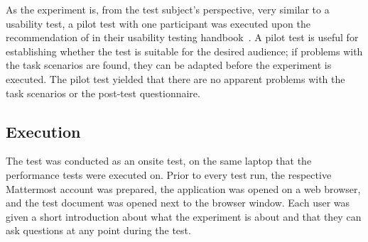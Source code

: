 As the experiment is, from the test subject's perspective, very similar to a usability test, a pilot test with one participant was executed upon the recommendation of \citeauthor{rubin2008handbook} in their usability testing handbook~\cite{rubin2008handbook}.
A pilot test is useful for establishing whether the test is suitable for the desired audience; if problems with the task scenarios are found, they can be adapted before the experiment is executed.
The pilot test yielded that there are no apparent problems with the task scenarios or the post-test questionnaire.

%
%
%
%
%
%


\subsection{Execution}

The test was conducted as an onsite test, on the same laptop that the performance tests were executed on.
Prior to every test run, the respective Mattermost account was prepared, the application was opened on a web browser, and the test document was opened next to the browser window.
Each user was given a short introduction about what the experiment is about and that they can ask questions at any point during the test.

